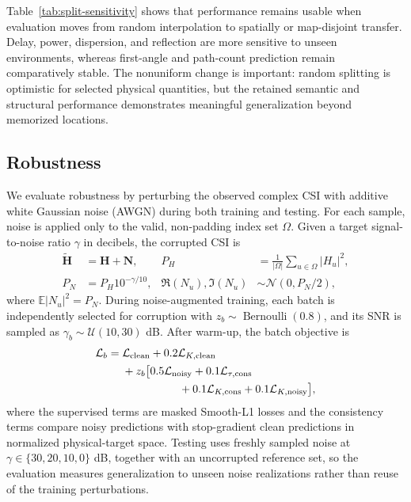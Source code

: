 Table~\ref{tab:split-sensitivity} shows that performance remains usable when evaluation moves from
random interpolation to spatially or map-disjoint transfer. Delay, power, dispersion, and reflection
are more sensitive to unseen environments, whereas first-angle and path-count prediction remain
comparatively stable. The nonuniform change is important: random splitting is optimistic for selected
physical quantities, but the retained semantic and structural performance demonstrates meaningful
generalization beyond memorized locations.

\subsection{Robustness}

We evaluate robustness by perturbing the observed complex CSI with additive white Gaussian noise
(AWGN) during both training and testing. For each sample, noise is applied only to the valid,
non-padding index set \(\Omega\). Given a target signal-to-noise ratio \(\gamma\) in decibels, the
corrupted CSI is
\begin{equation}
\begin{aligned}
\widetilde{\mathbf H}&=\mathbf H+\mathbf N, &
P_H&=\frac{1}{|\Omega|}\sum_{u\in\Omega}|H_u|^2,\\
P_N&=P_H10^{-\gamma/10}, &
\Re(N_u),\Im(N_u)&\sim\mathcal N(0,P_N/2),
\end{aligned}
\label{eq:complex-awgn}
\end{equation}
where \(\mathbb E|N_u|^2=P_N\). During noise-augmented training, each batch is independently
selected for corruption with \(z_b\sim\operatorname{Bernoulli}(0.8)\), and its SNR is sampled as
\(\gamma_b\sim\mathcal U(10,30)\) dB. After warm-up, the batch objective is
\begin{equation}
\begin{aligned}
\mathcal L_b={}&\mathcal L_{\mathrm{clean}}+0.2\mathcal L_{K,\mathrm{clean}}\\
&+z_b\bigl[0.5\mathcal L_{\mathrm{noisy}}+0.1\mathcal L_{\tau,\mathrm{cons}}\\
&\hspace{18mm}+0.1\mathcal L_{K,\mathrm{cons}}
+0.1\mathcal L_{K,\mathrm{noisy}}\bigr],
\end{aligned}
\label{eq:noise-training}
\end{equation}
where the supervised terms are masked Smooth-L1 losses and the consistency terms compare noisy
predictions with stop-gradient clean predictions in normalized physical-target space. Testing uses
freshly sampled noise at \(\gamma\in\{30,20,10,0\}\) dB, together with an uncorrupted reference set,
so the evaluation measures generalization to unseen noise realizations rather than reuse of the
training perturbations.

